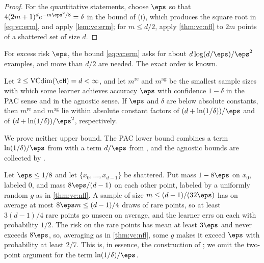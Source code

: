 \begin{refsection}
\begin{proof}
For the quantitative statements, choose $\eps$ so that $4(2m+1)^de^{-m\eps^2/8} = \delta$ in the bound of (i), which produces the square root in \eqref{eq:vc:erm}, and apply \cref{lem:vc:erm}; for $m\le d/2$, apply \cref{thm:vc:nfl} to $2m$ points of a shattered set of size $d$.
\end{proof}

For excess risk $\eps$, the bound \eqref{eq:vc:erm} asks for about $d\log(d/\eps)/\eps^2$ examples, and more than $d/2$ are needed. The exact order is known.

\begin{theorem}\label{thm:vc:sharp}
Let $2\le\vcdim(\cH) = d<\infty$, and let $m^{\mathrm{re}}$ and $m^{\mathrm{ag}}$ be the smallest sample sizes with which some learner achieves accuracy $\eps$ with confidence $1-\delta$ in the PAC sense and in the agnostic sense. If $\eps$ and $\delta$ are below absolute constants, then $m^{\mathrm{re}}$ and $m^{\mathrm{ag}}$ lie within absolute constant factors of $(d+\ln(1/\delta))/\eps$ and of $(d+\ln(1/\delta))/\eps^2$, respectively.
\end{theorem}

We prove neither upper bound. The PAC lower bound combines a term $\ln(1/\delta)/\eps$ from \textcite{BlumerEtAl1989} with a term $d/\eps$ from \textcite{EhrenfeuchtEtAl1989}, and the agnostic bounds are collected by \textcite[Theorem~6.8]{ShalevShwartzBenDavid2014}.

\begin{proofsketch}
Let $\eps\le1/8$ and let $\{x_0,\dots,x_{d-1}\}$ be shattered. Put mass $1-8\eps$ on $x_0$, labeled $0$, and mass $8\eps/(d-1)$ on each other point, labeled by a uniformly random $g$ as in \cref{thm:vc:nfl}. A sample of size $m\le(d-1)/(32\eps)$ has on average at most $8\eps m\le(d-1)/4$ draws of rare points, so at least $3(d-1)/4$ rare points go unseen on average, and the learner errs on each with probability $1/2$. The risk on the rare points has mean at least $3\eps$ and never exceeds $8\eps$, so, averaging as in \cref{thm:vc:nfl}, some $g$ makes it exceed $\eps$ with probability at least $2/7$. This is, in essence, the construction of \textcite{EhrenfeuchtEtAl1989}; we omit the two-point argument for the term $\ln(1/\delta)/\eps$.
\end{proofsketch}


\end{refsection}
